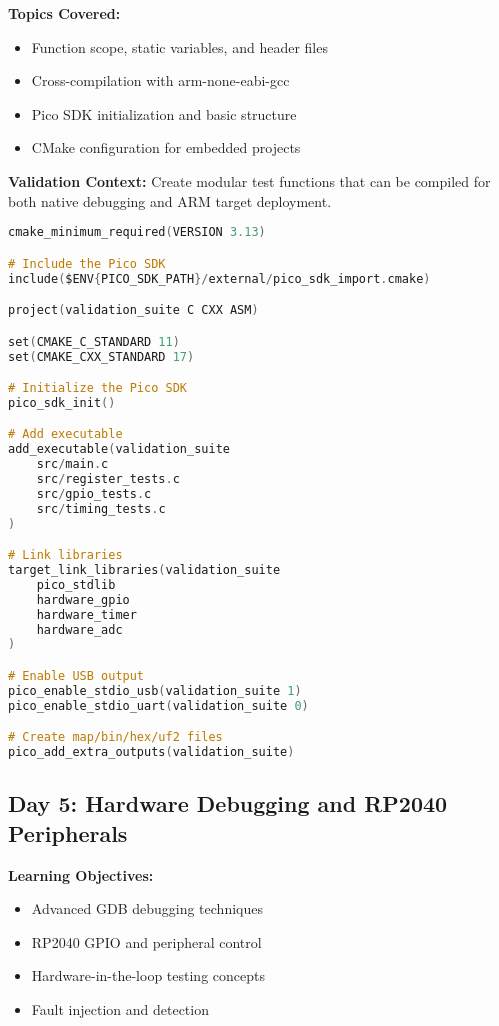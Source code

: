 \documentclass[11pt,a4paper]{article}
\begin{document}
\textbf{Topics Covered:}
\begin{itemize}
    \item Function scope, static variables, and header files
    \item Cross-compilation with arm-none-eabi-gcc
    \item Pico SDK initialization and basic structure
    \item CMake configuration for embedded projects
\end{itemize}

\textbf{Validation Context:}
Create modular test functions that can be compiled for both native debugging and ARM target deployment.

\begin{lstlisting}[language=C, caption=Day 4 Example: CMakeLists.txt for Pico]
cmake_minimum_required(VERSION 3.13)

# Include the Pico SDK
include($ENV{PICO_SDK_PATH}/external/pico_sdk_import.cmake)

project(validation_suite C CXX ASM)

set(CMAKE_C_STANDARD 11)
set(CMAKE_CXX_STANDARD 17)

# Initialize the Pico SDK
pico_sdk_init()

# Add executable
add_executable(validation_suite
    src/main.c
    src/register_tests.c
    src/gpio_tests.c
    src/timing_tests.c
)

# Link libraries
target_link_libraries(validation_suite
    pico_stdlib
    hardware_gpio
    hardware_timer
    hardware_adc
)

# Enable USB output
pico_enable_stdio_usb(validation_suite 1)
pico_enable_stdio_uart(validation_suite 0)

# Create map/bin/hex/uf2 files
pico_add_extra_outputs(validation_suite)
\end{lstlisting}

\subsection{Day 5: Hardware Debugging and RP2040 Peripherals}

\textbf{Learning Objectives:}
\begin{itemize}
    \item Advanced GDB debugging techniques
    \item RP2040 GPIO and peripheral control
    \item Hardware-in-the-loop testing concepts
    \item Fault injection and detection
\end{itemize}
\end{document}
